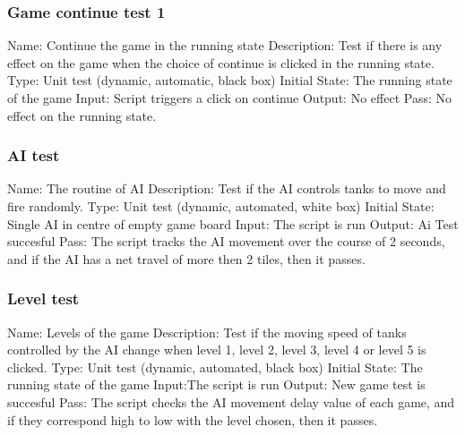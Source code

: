 \documentclass{article}
\begin{document}
\subsubsection{Game continue test 1}
Name:  Continue the game in the running state\newline
Description: Test if there is any effect on the game when the choice of 
continue is clicked in the running state. \newline
Type: Unit test (dynamic, automatic, black box) \newline
Initial State: The running state of the game \newline
Input: Script triggers a click on continue\newline
Output: No effect \newline
Pass: No effect on the running state. \newline

\subsubsection{AI test}
Name:  The routine of AI\newline
Description: Test if the AI controls tanks to move and fire randomly. \newline
Type: Unit test (dynamic, automated, white box) \newline
Initial State: Single AI in centre of empty game board \newline
Input: The script is run \newline
Output: Ai Test succesful \newline
Pass: The script tracks the AI movement over the course of 2 seconds,
and if the AI has a net travel of more then 2 tiles, then it passes.
 \newline

\subsubsection{Level test}
Name:  Levels of the game\newline
Description: Test if the moving speed of tanks controlled by the AI change 
when level 1, level 2, level 3, level 4 or level 5 is clicked. \newline
Type: Unit test (dynamic, automated, black box) \newline
Initial State:  The running state of the game \newline
Input:The script is run\newline
Output: New game test is succesful\newline
Pass: The script checks the AI movement delay value of each game, 
and if they correspond high to low with the level chosen, then it passes.
 \newline
\end{document}
